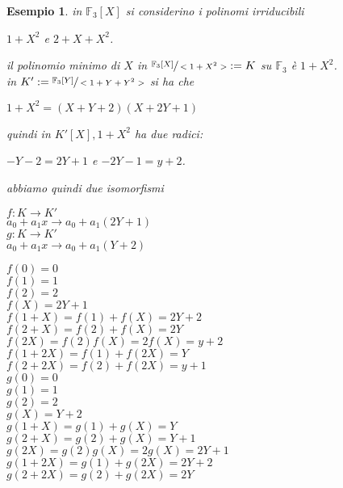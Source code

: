 \documentclass[a4paper,12pt]{article}
\theoremstyle{def}
\theoremstyle{prop}
\theoremstyle{esempio}
\newtheorem*{example}{Esempio}
\theoremstyle{dimostrazione}
\theoremstyle{teo}
\theoremstyle{osservazione}
\begin{document}
\begin{example}
    in \(\mathbb{F}_3[X]\) si considerino i polinomi irriducibili 
    \begin{center}
        \(1 + X^2\) e \(2 + X + X^2\).
    \end{center}
    il polinomio minimo di \(X\) in \(\sfrac{\mathbb{F}_3[X]}{<1 + X^2 >} := K\) su \(\mathbb{F}_3\) è \(1 + X^2\).\\
    in \(K' := \sfrac{\mathbb{F}_3[Y]}{<1 + Y + Y^2>}\) si ha che 
    \begin{center}
        \(1 + X^2 = (X + Y + 2)(X + 2Y + 1)\)
    \end{center}
    quindi in \(K'[X], 1 + X^2\) ha due radici:
    \begin{center}
        \(-Y-2 = 2Y+1\) e \(-2Y - 1 = y + 2\).
    \end{center}
    abbiamo quindi due isomorfismi
    \begin{center}
        \(f: K \rightarrow K'\)\\
        \(a_0 + a_1x \rightarrow a_0 + a_1(2Y + 1)\)\\
        \(g: K \rightarrow K'\)\\
        \(a_0 + a_1x \rightarrow a_0 + a_1(Y + 2)\)\\
    \end{center}
    \(f(0) = 0\)\\
    \(f(1) = 1\)\\
    \(f(2) = 2\)\\
    \(f(X) = 2Y + 1\)\\
    \(f(1 + X) = f(1) + f(X) = 2Y + 2\)\\
    \(f(2 + X) = f(2) + f(X) = 2Y\)\\
    \(f(2X) = f(2)f(X) = 2f(X) = y + 2\)\\
    \(f(1 + 2X) = f(1) + f(2X) = Y\)\\
    \(f(2 + 2X) = f(2) + f(2X) = y + 1\) \vspace{\baselineskip}\\
    \(g(0) = 0\)\\
    \(g(1) = 1\)\\
    \(g(2) = 2\)\\
    \(g(X) = Y + 2\)\\
    \(g(1 + X) = g(1) + g(X) = Y\)\\
    \(g(2 + X) = g(2) + g(X) = Y + 1\)\\
    \(g(2X) = g(2)g(X) = 2g(X) = 2Y + 1\)\\
    \(g(1 + 2X) = g(1) + g(2X) = 2Y + 2\)\\
    \(g(2 + 2X) = g(2) + g(2X) = 2Y\)\\
\end{example}
\end{document}
